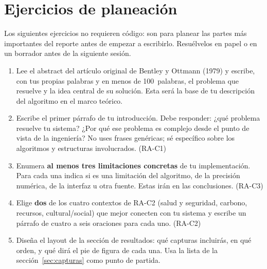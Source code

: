 \documentclass[12pt, oneside]{article}
\begin{document}
\section{Ejercicios de planeación}

Los siguientes ejercicios no requieren código: son para planear las
partes más importantes del reporte antes de empezar a escribirlo.
Resuélvelos en papel o en un borrador antes de la siguiente sesión.

\begin{enumerate}

  \item Lee el abstract del artículo original de Bentley y Ottmann
        (1979) y escribe, con tus propias palabras y en menos de
        100~palabras, el problema que resuelve y la idea central de
        su solución.  Esta será la base de tu descripción del algoritmo
        en el marco teórico.

  \item Escribe el primer párrafo de tu introducción.  Debe responder:
        ¿qué problema resuelve tu sistema?  ¿Por qué ese problema es
        complejo desde el punto de vista de la ingeniería?  No uses
        frases genéricas; sé específico sobre los algoritmos y
        estructuras involucrados.  (RA-C1)

  \item Enumera \textbf{al menos tres limitaciones concretas} de tu
        implementación.  Para cada una indica si es una limitación del
        algoritmo, de la precisión numérica, de la interfaz u otra
        fuente.  Estas irán en las conclusiones.  (RA-C3)

  \item Elige \textbf{dos} de los cuatro contextos de RA-C2 (salud y
        seguridad, carbono, recursos, cultural/social) que mejor
        conecten con tu sistema y escribe un párrafo de cuatro a seis
        oraciones para cada uno.  (RA-C2)

  \item Diseña el layout de la sección de resultados: qué capturas
        incluirás, en qué orden, y qué dirá el pie de figura de
        cada una.  Usa la lista de la sección~\ref{sec:capturas}
        como punto de partida.

\end{enumerate}

\end{document}
